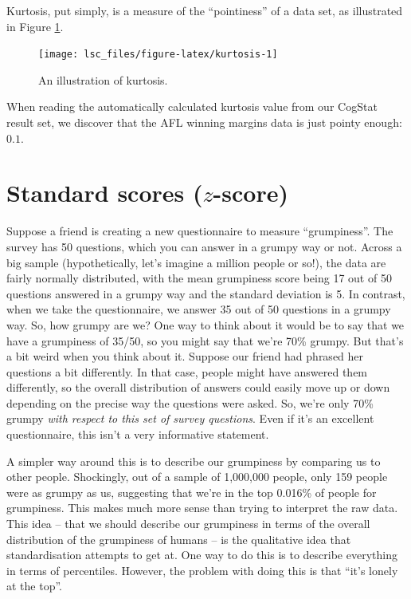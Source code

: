 \documentclass[
  11pt,
  a4paper,
  twoside,symmetric,openright]{book}
\theoremstyle{break}
\theoremstyle{break}
\begin{document}
Kurtosis, put simply, is a measure of the ``pointiness'' of a data set, as illustrated in Figure \ref{fig:kurtosis}.

\begin{figure}[H]

{\centering \texttt{[image: lsc\_files/figure-latex/kurtosis-1]} 

}

\caption{An illustration of kurtosis.}\label{fig:kurtosis}
\end{figure}

When reading the automatically calculated kurtosis value from our CogStat result set, we discover that the AFL winning margins data is just pointy enough: \(0.1\).

\hypertarget{zscore}{%
\section{\texorpdfstring{Standard scores (\(z\)-score)}{Standard scores (z-score)}}\label{zscore}}

Suppose a friend is creating a new questionnaire to measure ``grumpiness''. The survey has 50 questions, which you can answer in a grumpy way or not. Across a big sample (hypothetically, let's imagine a million people or so!), the data are fairly normally distributed, with the mean grumpiness score being 17 out of 50 questions answered in a grumpy way and the standard deviation is 5. In contrast, when we take the questionnaire, we answer 35 out of 50 questions in a grumpy way. So, how grumpy are we? One way to think about it would be to say that we have a grumpiness of 35/50, so you might say that we're 70\% grumpy. But that's a bit weird when you think about it. Suppose our friend had phrased her questions a bit differently. In that case, people might have answered them differently, so the overall distribution of answers could easily move up or down depending on the precise way the questions were asked. So, we're only 70\% grumpy \emph{with respect to this set of survey questions}. Even if it's an excellent questionnaire, this isn't a very informative statement.

A simpler way around this is to describe our grumpiness by comparing us to other people. Shockingly, out of a sample of 1,000,000 people, only 159 people were as grumpy as us, suggesting that we're in the top 0.016\% of people for grumpiness. This makes much more sense than trying to interpret the raw data. This idea -- that we should describe our grumpiness in terms of the overall distribution of the grumpiness of humans -- is the qualitative idea that standardisation attempts to get at. One way to do this is to describe everything in terms of percentiles. However, the problem with doing this is that ``it's lonely at the top''.
\end{document}
